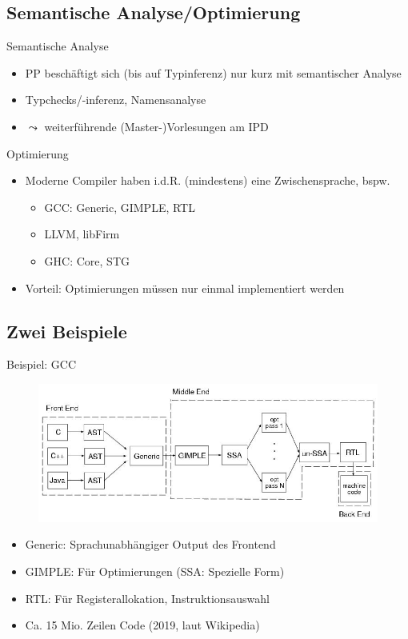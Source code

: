 
\subsection{Semantische Analyse/Optimierung}

\begin{frame}{Semantische Analyse}
	\begin{itemize}
		\item PP beschäftigt sich (bis auf Typinferenz) nur kurz mit semantischer Analyse
		\item Typchecks/-inferenz, Namensanalyse
		\item $\leadsto$ weiterführende (Master-)Vorlesungen am IPD
	\end{itemize}
\end{frame}

\begin{frame}{Optimierung}
  \begin{itemize}
    \item Moderne Compiler haben i.d.R. (mindestens) eine Zwischensprache, bspw.
    \begin{itemize}
      \item GCC: Generic, GIMPLE, RTL
      \item LLVM, libFirm
      \item GHC: Core, STG
    \end{itemize}
    \item Vorteil: Optimierungen müssen nur einmal implementiert werden
  \end{itemize}
\end{frame}

\subsection{Zwei Beispiele}

\begin{frame}{Beispiel: GCC}
  \begin{figure}
    \includegraphics[width=\textwidth]{images/gcc.jpg}
  \end{figure}

  \begin{itemize}
    \item Generic: Sprachunabhängiger Output des Frontend
    \item GIMPLE: Für Optimierungen (SSA: Spezielle Form)
    \item RTL: Für Registerallokation, Instruktionsauswahl
    \item Ca. 15 Mio. Zeilen Code (2019, laut Wikipedia)
  \end{itemize}
\end{frame}


